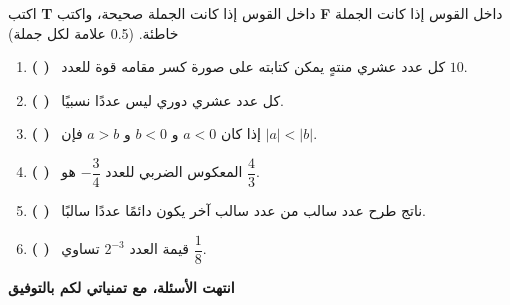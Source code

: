 \documentclass[12pt, a4paper]{article}
\begin{document}
اكتب \textbf{T} داخل القوس إذا كانت الجملة صحيحة، واكتب \textbf{F} داخل القوس إذا كانت الجملة خاطئة. \hfill (0.5 علامة لكل جملة)

\begin{enumerate}[label=\textbf{\arabic*)}, itemsep=0.12cm, leftmargin=*]
\item \textbf{( \hspace{1cm} )} \ كل عدد عشري منتهٍ يمكن كتابته على صورة كسر مقامه قوة للعدد $10$.
\item \textbf{( \hspace{1cm} )} \ كل عدد عشري دوري ليس عددًا نسبيًا.
\item \textbf{( \hspace{1cm} )} \ إذا كان $a < 0$ و $b < 0$ و $a > b$ فإن $|a| < |b|$.
\item \textbf{( \hspace{1cm} )} \ المعكوس الضربي للعدد $-\dfrac{3}{4}$ هو $\dfrac{4}{3}$.
\item \textbf{( \hspace{1cm} )} \ ناتج طرح عدد سالب من عدد سالب آخر يكون دائمًا عددًا سالبًا.
\item \textbf{( \hspace{1cm} )} \ قيمة العدد $2^{-3}$ تساوي $\dfrac{1}{8}$.
\end{enumerate}

\vfill
\begin{center}
\textbf{\large انتهت الأسئلة، مع تمنياتي لكم بالتوفيق}
\end{center}
\end{document}

